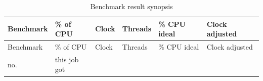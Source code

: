 \begin{longtable}[]{@{}llllll@{}}
\caption{Benchmark result synopsis}\tabularnewline
\toprule
\begin{minipage}[b]{0.14\columnwidth}\raggedright\strut
Benchmark\strut
\end{minipage} & \begin{minipage}[b]{0.14\columnwidth}\raggedright\strut
\% of CPU\strut
\end{minipage} & \begin{minipage}[b]{0.14\columnwidth}\raggedright\strut
Clock\strut
\end{minipage} & \begin{minipage}[b]{0.14\columnwidth}\raggedright\strut
Threads\strut
\end{minipage} & \begin{minipage}[b]{0.14\columnwidth}\raggedright\strut
\% CPU ideal\strut
\end{minipage} & \begin{minipage}[b]{0.14\columnwidth}\raggedright\strut
Clock adjusted\strut
\end{minipage}\tabularnewline
\midrule
\endfirsthead
\toprule
\begin{minipage}[b]{0.14\columnwidth}\raggedright\strut
Benchmark\strut
\end{minipage} & \begin{minipage}[b]{0.14\columnwidth}\raggedright\strut
\% of CPU\strut
\end{minipage} & \begin{minipage}[b]{0.14\columnwidth}\raggedright\strut
Clock\strut
\end{minipage} & \begin{minipage}[b]{0.14\columnwidth}\raggedright\strut
Threads\strut
\end{minipage} & \begin{minipage}[b]{0.14\columnwidth}\raggedright\strut
\% CPU ideal\strut
\end{minipage} & \begin{minipage}[b]{0.14\columnwidth}\raggedright\strut
Clock adjusted\strut
\end{minipage}\tabularnewline
\midrule
\endhead
\begin{minipage}[t]{0.14\columnwidth}\raggedright\strut
no.\strut
\end{minipage} & \begin{minipage}[t]{0.14\columnwidth}\raggedright\strut
this job got\strut
\end{minipage} & \begin{minipage}[t]{0.14\columnwidth}\raggedright\strut

\end{minipage}
\end{longtable}
